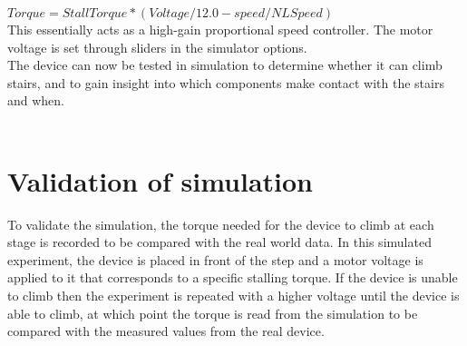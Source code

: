 $Torque = StallTorque*(Voltage/12.0-speed/NLSpeed)$\\

This essentially acts as a high-gain proportional speed controller. The motor voltage is set through sliders in the simulator options. \\
The device can now be tested in simulation to determine whether it can climb stairs, and to gain insight into which components make contact with the stairs and when.\\
\\
\section{Validation of simulation}
To validate the simulation, the torque needed for the device to climb at each stage is recorded to be compared with the real world data. In this simulated experiment, the device is placed in front of the step and a motor voltage is applied to it that corresponds to a specific stalling torque. If the device is unable to climb then the experiment is repeated with a higher voltage until the device is able to climb, at which point the torque is read from the simulation to be compared with the measured values from the real device.\\

